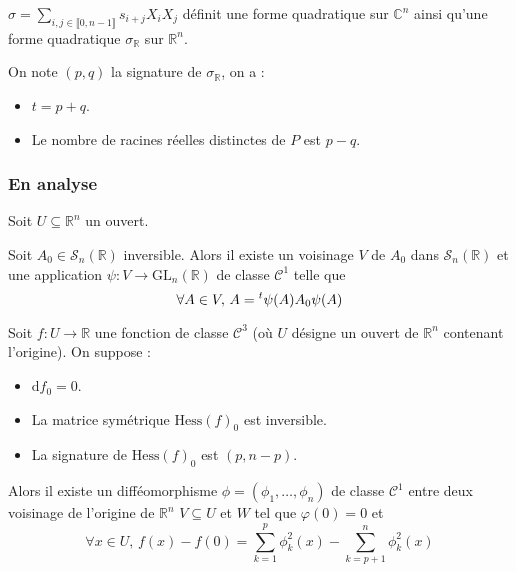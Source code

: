   \begin{proposition}
    $\sigma = \sum_{i, j \in \llbracket 0, n-1 \rrbracket} s_{i+j} X_i X_j$ définit une forme quadratique sur $\mathbb{C}^n$ ainsi qu'une forme quadratique $\sigma_{\mathbb{R}}$ sur $\mathbb{R}^n$.
  \end{proposition}


  \begin{theorem}
    On note $(p,q)$ la signature de $\sigma_{\mathbb{R}}$, on a :
    \begin{itemize}
      \item $t = p + q$.
      \item Le nombre de racines réelles distinctes de $P$ est $p-q$.
    \end{itemize}
  \end{theorem}

  \subsubsection{En analyse}

  Soit $U \subseteq \mathbb{R}^n$ un ouvert.


  \begin{lemma}
    Soit $A_0 \in \mathcal{S}_n(\mathbb{R})$ inversible. Alors il existe un voisinage $V$ de $A_0$ dans $\mathcal{S}_n(\mathbb{R})$ et une application $\psi : V \rightarrow \mathrm{GL}_n(\mathbb{R})$ de classe $\mathcal{C}^1$ telle que
    \[ \forall A \in V, \, A = \mathstrut ^t \psi(A) A_0 \psi(A) \]
  \end{lemma}


  \begin{lemma}[Morse]
    Soit $f : U \rightarrow \mathbb{R}$ une fonction de classe $\mathcal{C}^3$ (où $U$ désigne un ouvert de $\mathbb{R}^n$ contenant l'origine). On suppose :
    \begin{itemize}
      \item $\mathrm{d} f_0 = 0$.
      \item La matrice symétrique $\mathrm{Hess} (f)_0$ est inversible.
      \item La signature de $\mathrm{Hess}(f)_0$ est $(p, n-p)$.
    \end{itemize}
    Alors il existe un difféomorphisme $\phi = (\phi_1, \dots, \phi_n)$ de classe $\mathcal{C}^1$ entre deux voisinage de l'origine de $\mathbb{R}^n$ $V \subseteq U$ et $W$ tel que $\varphi(0) = 0$ et
    \[ \forall x \in U, \, f(x) - f(0) = \sum_{k=1}^p \phi_k^2(x) - \sum_{k=p+1}^n \phi_k^2(x) \]
  \end{lemma}

